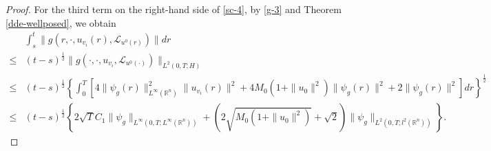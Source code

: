\documentclass[11pt]{article}
\numberwithin{equation}{section}
\theoremstyle{plain}
\def\leq{\leqslant}
\begin{document}
\begin{proof}
    For the third term on the right-hand side of \eqref{sc-4},
    by \eqref{g-3}  and Theorem \ref{dde-wellposed}, we obtain
    \begin{align} \label{sc-7}
        & \int_s^t \| g(r, \cdot, u_{v_i}(r), \mathcal{L}_{u^0(r)} ) \| dr
        \nonumber \\
        \leq & (t-s)^{\frac{1}{2}} \| g(\cdot, \cdot, u_{v_i}, \mathcal{L}_{u^0(\cdot)} ) \|_{ L^2(0, T; H) }
        \nonumber \\
        \leq & (t-s)^{\frac{1}{2}}
        \left\{
        \int_0^T
        \left[ 4 \| \psi_g(r) \|_{L^\infty(\mathbb{R}^n) }^2
        \|  u_{v_i} (r) \|^2 +
        4 M_0( 1 + \|u_0\|^2 )
        \| \psi_g(r)\|^2
        + 2 \| \psi_g(r) \|^2
        \right]
        dr
        \right\}^{\frac{1}{2}}
        \nonumber \\
        \leq & (t-s)^{\frac{1}{2}}
        \left\{ 2 \sqrt{T} C_1 \| \psi_g \|_{L^\infty(0,T; L^\infty(\mathbb{R}^n) ) }
        + (2 \sqrt{M_0( 1 + \|u_0\|^2 )}
        + \sqrt{2}) \| \psi_g \|_{L^2(0,T; l^2(\mathbb{R}^n) ) }
        \right\}.
    \end{align}


\end{proof}
\end{document}
